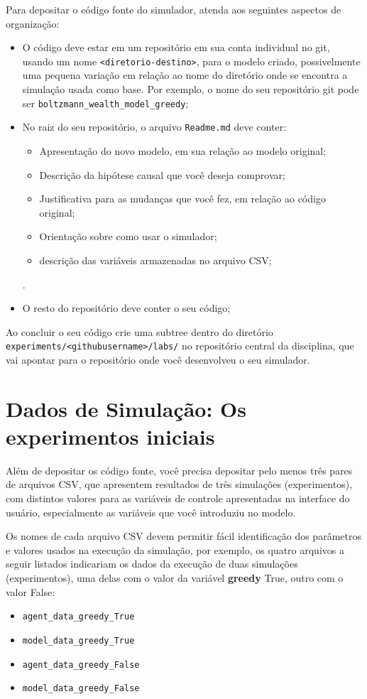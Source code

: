 Para depositar o código fonte do simulador, atenda aos seguintes aspectos de organização:
\begin{itemize}
    \item O código deve estar em um repositório em sua conta individual no git, usando um nome \verb|<diretorio-destino>|, para o modelo criado, possivelmente uma pequena variação em relação ao nome do diretório onde se encontra a simulação usada como base. Por exemplo, o nome do seu repositório git pode ser
    \verb|boltzmann_wealth_model_greedy|;
    \item No raiz do seu repositório, o arquivo \verb|Readme.md| deve conter:
    \begin{itemize}
        \item Apresentação do novo modelo, em sua relação ao modelo original;
        \item Descrição da hipótese causal que você deseja comprovar;
        \item Justificativa para as mudanças que você fez, em relação ao código original;
        \item Orientação sobre como usar o simulador;
        \item descrição das variáveis armazenadas no arquivo CSV;
    \end{itemize}.
    \item O resto do repositório deve conter o seu código;
\end{itemize}

Ao concluir o seu código crie uma subtree dentro do diretório \verb|experiments/<githubusername>/labs/| no repositório central da disciplina, que vai apontar para o repositório onde você desenvolveu o seu simulador.

\section{Dados de Simulação: Os experimentos iniciais}

Além de depositar os código fonte, você precisa depositar pelo menos três pares de arquivos CSV, que apresentem resultados de três simulações (experimentos), com distintos valores para as variáveis de controle apresentadas na interface do usuário, especialmente as variáveis que você introduziu no modelo.

Os nomes de cada arquivo CSV devem permitir fácil identificação dos  parâmetros e valores usados na execução da simulação, por exemplo, os quatro arquivos a seguir listados indicariam os dados da execução de duas simulações (experimentos), uma delas com o valor da variável \textbf{greedy} True, outro com o valor False:
\begin{itemize}
    \item \verb|agent_data_greedy_True|
    \item \verb|model_data_greedy_True|
    \item \verb|agent_data_greedy_False|
    \item \verb|model_data_greedy_False|
\end{itemize}

